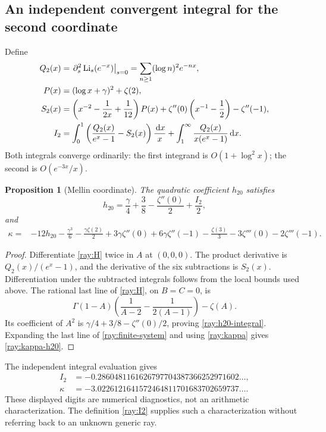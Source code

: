 \documentclass[11pt]{article}
\numberwithin{equation}{section}
\newtheorem{proposition}[theorem]{Proposition}
\theoremstyle{definition}
\theoremstyle{remark}
\newcommand{\Li}{\operatorname{Li}}
\newcommand{\dd}{\,\mathrm d}
\begin{document}
\subsection{An independent convergent integral for the second coordinate}

Define
\begin{align}
 Q_2(x)&=\left.\partial_s^2\Li_s(e^{-x})\right|_{s=0}
               =\sum_{n\ge1}(\log n)^2e^{-nx},\notag\\
 P(x)&=(\log x+\gamma)^2+\zeta(2),\notag\\
 S_2(x)&=\left(x^{-2}-\frac1{2x}+\frac1{12}\right)P(x)
             +\zeta''(0)\left(x^{-1}-\frac12\right)-\zeta''(-1),\notag\\
 I_2&=\int_0^1\left(\frac{Q_2(x)}{e^x-1}-S_2(x)\right)\frac{\dd x}{x}
       +\int_1^\infty\frac{Q_2(x)}{x(e^x-1)}\dd x.
 \label{ray:I2}
\end{align}
Both integrals converge ordinarily: the first integrand is
$O(1+\log^2x)$; the second is $O(e^{-3x}/x)$.

\begin{proposition}[Mellin coordinate]\label{prop:kappa-integral}
The quadratic coefficient $h_{20}$ satisfies
\begin{equation}\label{ray:h20-integral}
 h_{20}=\frac\gamma4+\frac38-\frac{\zeta''(0)}2+\frac{I_2}{2},
\end{equation}
and
\begin{align}
 \kappa={}&-12h_{20}-\frac{\gamma^3}{6}
       -\frac{\gamma\zeta(2)}2+3\gamma\zeta''(0)
       +6\gamma\zeta''(-1)-\frac{\zeta(3)}3
       -3\zeta'''(0)-2\zeta'''(-1).
 \label{ray:kappa-h20}
\end{align}
\end{proposition}
\begin{proof}
Differentiate \eqref{ray:H} twice in $A$ at $(0,0,0)$.
The product derivative is $Q_2(x)/(e^x-1)$, and the derivative of
the six subtractions is $S_2(x)$. Differentiation under the subtracted
integrals follows from the local bounds used above. The rational
last line of \eqref{ray:H}, on $B=C=0$, is
\[
 \Gamma(1-A)\left(\frac1{A-2}-\frac1{2(A-1)}\right)-\zeta(A).
\]
Its coefficient of $A^2$ is
$\gamma/4+3/8-\zeta''(0)/2$, proving
\eqref{ray:h20-integral}. Expanding the last line of
\eqref{ray:finite-system} and using \eqref{ray:kappa} gives
\eqref{ray:kappa-h20}.
\end{proof}

The independent integral evaluation gives
\begin{align*}
 I_2&=-0.2860481161626797704387366252971602\ldots,\\
 \kappa&=-3.0226121641572464811701683702659737\ldots.
\end{align*}
These displayed digits are numerical diagnostics, not an arithmetic
characterization. The definition \eqref{ray:I2} supplies such a
characterization without referring back to an unknown generic ray.
\end{document}
